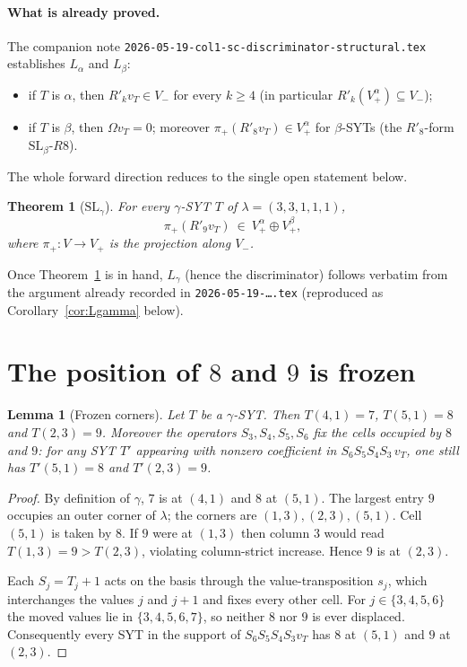 \documentclass[11pt]{article}
\newtheorem{theorem}{Theorem}
\newtheorem{lemma}{Lemma}
\newcommand{\Vp}{V_{+}}
\newcommand{\Vm}{V_{-}}
\newcommand{\Va}{V_{+}^{\alpha}}
\newcommand{\Vb}{V_{+}^{\beta}}
\begin{document}
\paragraph{What is already proved.}
The companion note
\texttt{2026-05-19-col1-sc-discriminator-structural.tex} establishes
$L_\alpha$ and $L_\beta$:
\begin{itemize}
\item[$L_\alpha$:] if $T$ is $\alpha$, then $R'_k v_T \in \Vm$ for every $k\ge 4$
  (in particular $R'_k(\Va)\subseteq\Vm$);
\item[$L_\beta$:] if $T$ is $\beta$, then $\Omega v_T = 0$; moreover
  $\pi_+(R'_8 v_{T})\in\Va$ for $\beta$-SYTs (the $R'_8$-form
  $\mathrm{SL}_\beta\text{-}R8$).
\end{itemize}
The whole forward direction reduces to the single open statement below.

\begin{theorem}[$\mathrm{SL}_\gamma$]\label{thm:slg}
For every $\gamma$-SYT $T$ of $\lambda=(3,3,1,1,1)$,
\[
\pi_+(R'_9 v_T)\ \in\ \Va\oplus\Vb ,
\]
where $\pi_+\colon V\to\Vp$ is the projection along $\Vm$.
\end{theorem}

Once Theorem~\ref{thm:slg} is in hand, $L_\gamma$ (hence the discriminator)
follows verbatim from the argument already recorded in
\texttt{2026-05-19-\dots.tex} (reproduced as
Corollary~\ref{cor:Lgamma} below).

\section{The position of $8$ and $9$ is frozen}

\begin{lemma}[Frozen corners]\label{lem:frozen}
Let $T$ be a $\gamma$-SYT. Then $T(4,1)=7$, $T(5,1)=8$ and $T(2,3)=9$.
Moreover the operators $S_3,S_4,S_5,S_6$ fix the cells occupied by $8$ and $9$:
for any SYT $T'$ appearing with nonzero coefficient in
$S_6 S_5 S_4 S_3\, v_T$, one still has $T'(5,1)=8$ and $T'(2,3)=9$.
\end{lemma}

\begin{proof}
By definition of $\gamma$, $7$ is at $(4,1)$ and $8$ at $(5,1)$. The largest
entry $9$ occupies an outer corner of $\lambda$; the corners are $(1,3),(2,3),
(5,1)$. Cell $(5,1)$ is taken by $8$. If $9$ were at $(1,3)$ then column $3$
would read $T(1,3)=9 > T(2,3)$, violating column-strict increase. Hence
$9$ is at $(2,3)$.

Each $S_j=T_j+1$ acts on the basis through the value-transposition $s_j$, which
interchanges the values $j$ and $j+1$ and fixes every other cell. For
$j\in\{3,4,5,6\}$ the moved values lie in $\{3,4,5,6,7\}$, so neither $8$ nor
$9$ is ever displaced. Consequently every SYT in the support of
$S_6S_5S_4S_3v_T$ has $8$ at $(5,1)$ and $9$ at $(2,3)$.
\end{proof}
\end{document}
